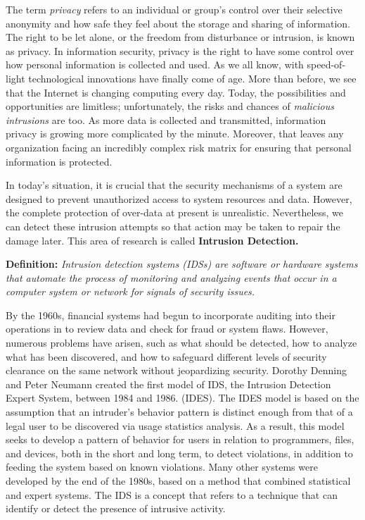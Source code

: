 \documentclass[12pt]{article}
\begin{document}
    The term \textit{privacy} refers to an individual or group’s control over their selective anonymity and how safe they feel about the storage and sharing of information. The right to be let alone, or the freedom from disturbance or intrusion, is known as privacy. In information security, privacy is the right to have some control over how personal information is collected and used. As we all know, with speed-of-light technological innovations have finally come of age. More than before, we see that the Internet is changing computing every day. Today, the possibilities and opportunities are limitless; unfortunately, the risks and chances of \textit{malicious intrusions} are too. As more data is collected and transmitted, information privacy is growing more complicated by the minute. Moreover, that leaves any organization facing an incredibly complex risk matrix for ensuring that personal information is protected. 
    \\
    \par In today’s situation, it is crucial that the security mechanisms of a system are designed to prevent unauthorized access to system resources and data. However, the complete protection of over-data at present is unrealistic. Nevertheless, we can detect these intrusion attempts so that action may be taken to repair the damage later. This area of research is called \textbf{Intrusion Detection.}
    \\
    \par \textbf{Definition:} \textit{Intrusion detection systems (IDSs) are software or hardware systems that automate the process of monitoring and analyzing events that occur in a computer system or network for signals of security issues.}
    \\
    \par By the 1960s, financial systems had begun to incorporate auditing into their operations in to review data and check for fraud or system flaws. However, numerous problems have arisen, such as what should be detected, how to analyze what has been discovered, and how to safeguard different levels of security clearance on the same network without jeopardizing security. Dorothy Denning and Peter Neumann created the first model of IDS, the Intrusion Detection Expert System, between 1984 and 1986. (IDES). The IDES model is based on the assumption that an intruder's behavior pattern is distinct enough from that of a legal user to be discovered via usage statistics analysis. As a result, this model seeks to develop a pattern of behavior for users in relation to programmers, files, and devices, both in the short and long term, to detect violations, in addition to feeding the system based on known violations. Many other systems were developed by the end of the 1980s, based on a method that combined statistical and expert systems. The IDS is a concept that refers to a technique that can identify or detect the presence of intrusive activity. 
\end{document}
